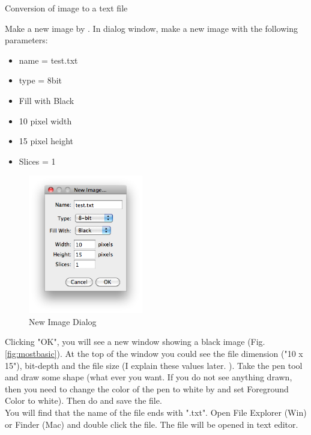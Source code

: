 \begin{indentexercise}{1}
\label{exer:1111}
\item Conversion of image to a text file
\item Make a new image by . In dialog window,
make a new image with the following parameters:

\begin{itemize}
\item name = test.txt
\item type = 8bit
\item Fill with Black
\item 10 pixel width
\item 15 pixel height
\item Slices = 1
\end{itemize}


\begin{figure}[htbp]
\begin{center}
\includegraphics[width=5cm]{img/CMCIBasicCourse201102-img1.png}
\caption{ New Image Dialog}
\label{fig:img1}
\end{center}
\end{figure}
Clicking "OK", you will see a new window showing a black image (Fig.
\ref{fig:mostbasic}). At the top of the window you could see the file dimension ("10 x 15"), 
bit-depth and the file size (I explain these values later.
). Take the pen tool and draw some shape (what ever you want. 
If you do not see anything drawn, then you need to change the color of the pen to white by 
 and set Foreground Color to white). 
Then do  and save the file. \\

You will find that the name of the file ends with ".txt". 
Open File Explorer (Win) or Finder (Mac) and double click the file. 
The file will be opened in text editor.


\end{indentexercise}
